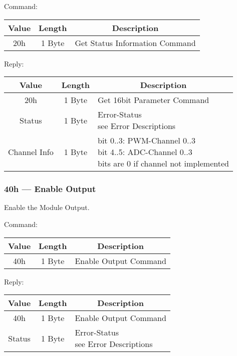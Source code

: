Command:
\begin{table}[H]
    \centering
    \begin{tabular}{|c|c|l|}
        \hline
        \textbf{Value}   &   \textbf{Length} & \multicolumn{1}{|c|}{\textbf{Description}}\\ \hline \hline
        20h   &  1 Byte & Get Status Information Command \\ \hline
    \end{tabular}
\label{tab:CAN-20-C}
\end{table}
Reply:
\begin{table}[H]
    \centering
    \begin{tabular}{|c|c|l|}
        \hline
        \textbf{Value}   &   \textbf{Length} & \multicolumn{1}{|c|}{\textbf{Description}}\\ \hline \hline
        20h   &  1 Byte & Get 16bit Parameter Command \\ \hline
        Status & 1 Byte & \makecell[l]{Error-Status\\see Error Descriptions}\\ \hline
        Channel Info & 1 Byte & \makecell[l]{bit 0..3: PWM-Channel 0..3\\bit 4..5: ADC-Channel 0..3\\bits are 0 if channel not implemented} \\ \hline
    \end{tabular}
\label{tab:CAN-20-R}
\end{table}
\subsubsection{40h --- Enable Output}
Enable the Module Output.

Command:
\begin{table}[H]
    \centering
    \begin{tabular}{|c|c|l|}
        \hline
        \textbf{Value}   &   \textbf{Length} & \multicolumn{1}{|c|}{\textbf{Description}}\\ \hline \hline
        40h   &  1 Byte & Enable Output Command \\ \hline
    \end{tabular}
\label{tab:CAN-40-C}
\end{table}
Reply:
\begin{table}[H]
    \centering
    \begin{tabular}{|c|c|l|}
        \hline
        \textbf{Value}   &   \textbf{Length} & \multicolumn{1}{|c|}{\textbf{Description}}\\ \hline \hline
        40h   &  1 Byte & Enable Output Command \\ \hline
        Status & 1 Byte & \makecell[l]{Error-Status\\see Error Descriptions}\\ \hline
    \end{tabular}
\label{tab:CAN-40-R}
\end{table}
